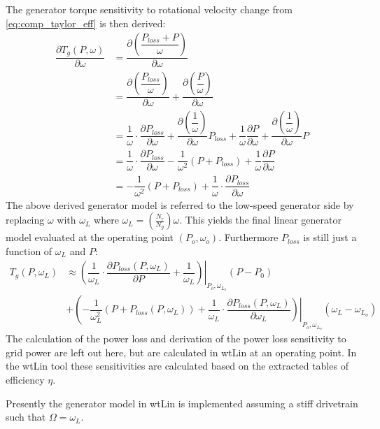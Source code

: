 The generator torque sensitivity to rotational velocity change from \cref{eq:comp_taylor_eff} is then derived:
\begin{align}
	\dfrac{\partial T_g(P, \omega)}{\partial \omega} & = \dfrac{\partial \left (\dfrac{P_{loss} +  P}{\omega}\right )}{\partial \omega} \\
	& = \dfrac{\partial \left (\dfrac{P_{loss}}{\omega} \right )}{\partial \omega} + \dfrac{\partial \left (\dfrac{P}{\omega} \right )}{\partial \omega} \\
	& = \dfrac{1}{\omega} \cdot \dfrac{\partial P_{loss}}{\partial \omega} + \dfrac{\partial \left (\dfrac{1}{\omega} \right)}{\partial \omega} P_{loss} + \dfrac{1}{\omega} \dfrac{\partial P}{\partial \omega} + \dfrac{\partial \left (\dfrac{1}{\omega} \right )}{\partial \omega} P \\
	& = \dfrac{1}{\omega} \cdot  \dfrac{\partial P_{loss}}{\partial \omega} - \dfrac{1}{\omega^2}(P + P_{loss}) + \dfrac{1}{\omega} \dfrac{\partial P}{\partial \omega} \\
	& = -\dfrac{1}{\omega^2}(P + P_{loss}) + \dfrac{1}{\omega} \cdot \dfrac{\partial P_{loss}}{\partial \omega}
\end{align}
The above derived generator model is referred to the low-speed generator side by replacing $ \omega $ with $ \omega_L $ where $ \omega_L = \left (\frac{N_r}{N_g} \right ) \omega $. This yields the final linear generator model evaluated at the operating point $ (P_o, \omega_o) $. Furthermore $P_{loss}$ is still just a function of $ \omega_L $ and $ P $:
\begin{equation}
	\begin{split}
		T_g(P, \omega_L) 	& \approx \left. \left ( \dfrac{1}{\omega_L} \cdot \dfrac{\partial P_{loss}(P, \omega_L)}{\partial P} + \dfrac{1}{\omega_L} \right ) \right |_{P_o,\omega_{L_o}} (P - P_0) \\ 
		& + \left ( -\dfrac{1}{\omega_L^2}(P + P_{loss}(P, \omega_L)) + \left. \dfrac{1}{\omega_L} \cdot \dfrac{\partial P_{loss}(P, \omega_L)}{\partial \omega_L} \right ) \right |_{P_o,\omega_{L_o}} (\omega_L - \omega_{L_o})
	\end{split}
\end{equation}
The calculation of the power loss and derivation of the power loss sensitivity to grid power are left out here, but are calculated in wtLin at an operating point. In the wtLin tool these sensitivities are calculated based on the extracted tables of efficiency $ \eta $.

Presently the generator model in wtLin is implemented assuming a stiff drivetrain such that $ \Omega = \omega_L $.

